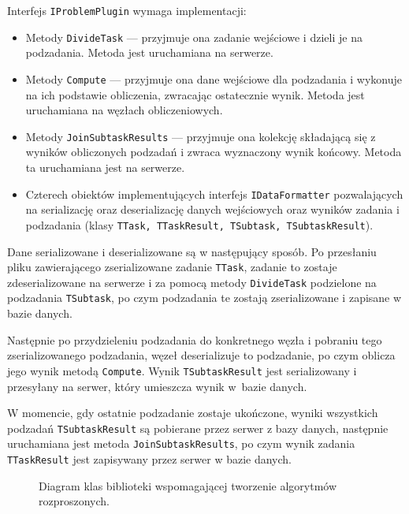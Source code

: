 \documentclass[a4paper,11pt,twoside]{report}
\theoremstyle{definition}
\begin{document}
Interfejs \texttt{IProblemPlugin} wymaga implementacji:
\begin{itemize}
    \item Metody \texttt{DivideTask} --- przyjmuje ona zadanie wejściowe i dzieli je na podzadania. Metoda jest uruchamiana na serwerze.
    \item Metody \texttt{Compute} --- przyjmuje ona dane wejściowe dla podzadania i wykonuje na ich podstawie obliczenia, zwracając ostatecznie wynik. Metoda jest uruchamiana na węzłach obliczeniowych.
    \item Metody \texttt{JoinSubtaskResults} --- przyjmuje ona kolekcję składającą się z wyników obliczonych podzadań i zwraca wyznaczony wynik końcowy. Metoda ta uruchamiana jest na serwerze.
    \item Czterech obiektów implementujących interfejs \texttt{IDataFormatter} pozwalających na serializację oraz deserializację danych wejściowych oraz wyników zadania i podzadania (klasy \texttt{TTask, TTaskResult, TSubtask, TSubtaskResult}).
\end{itemize}

Dane serializowane i deserializowane są w następujący sposób. Po przesłaniu pliku zawierającego zserializowane zadanie \texttt{TTask}, zadanie to zostaje zdeserializowane na serwerze i za pomocą metody \texttt{DivideTask} podzielone na podzadania \texttt{TSubtask}, po czym podzadania te zostają zserializowane i zapisane w bazie danych.

Następnie po przydzieleniu podzadania do konkretnego węzła i pobraniu tego zserializowanego podzadania, węzeł deserializuje to podzadanie, po czym oblicza jego wynik metodą \texttt{Compute}. Wynik \texttt{TSubtaskResult} jest serializowany i przesyłany na serwer, który umieszcza wynik w~bazie danych.

W momencie, gdy ostatnie podzadanie zostaje ukończone, wyniki wszystkich podzadań \texttt{TSubtaskResult} są pobierane przez serwer z bazy danych, następnie uruchamiana jest metoda \texttt{JoinSubtaskResults}, po czym wynik zadania \texttt{TTaskResult} jest zapisywany przez serwer w bazie danych.

\begin{figure} 
    \caption{Diagram klas biblioteki wspomagającej tworzenie algorytmów rozproszonych.}
    \label{library-class}
\end{figure}
\end{document}
